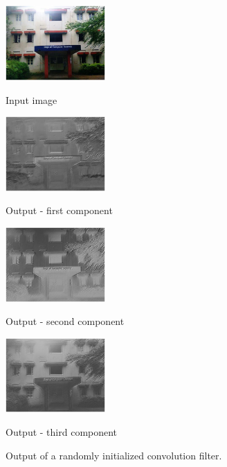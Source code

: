 \documentclass{article}
\begin{document}
\begin{figure}[t]

\begin{minipage}[b]{.48\linewidth}
  \centering
  \centerline{\includegraphics[width=3.8cm]{Figures/org}}
  \centerline{Input image}\medskip
\end{minipage}
%
\begin{minipage}[b]{.48\linewidth}
  \centering
  \centerline{\includegraphics[width=3.8cm]{Figures/first}}
  \centerline{Output - first component }\medskip
\end{minipage}
\hfill
\begin{minipage}[b]{0.48\linewidth}
  \centering
  \centerline{\includegraphics[width=3.8cm]{Figures/second}}
  \centerline{Output - second component}\medskip
\end{minipage}
%
\begin{minipage}[b]{0.48\linewidth}
  \centering
  \centerline{\includegraphics[width=3.8cm]{Figures/third}}
  \centerline{Output - third component}\medskip
\end{minipage}
%
\caption{Output of a randomly initialized convolution filter.
}
\label{fig:res}
%
\end{figure}
\end{document}
